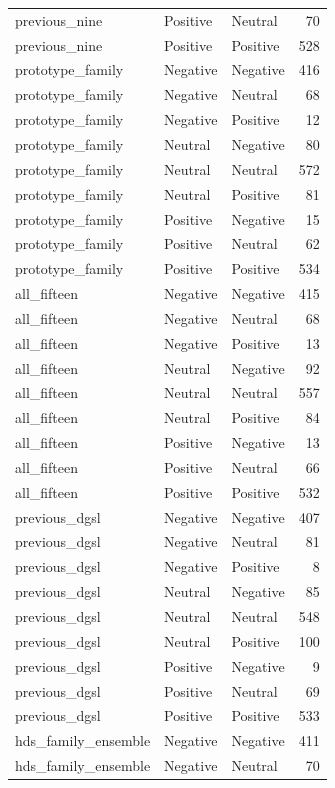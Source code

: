 \begin{tabular}{lllr}
previous\_nine & Positive & Neutral & 70 \\
previous\_nine & Positive & Positive & 528 \\
prototype\_family & Negative & Negative & 416 \\
prototype\_family & Negative & Neutral & 68 \\
prototype\_family & Negative & Positive & 12 \\
prototype\_family & Neutral & Negative & 80 \\
prototype\_family & Neutral & Neutral & 572 \\
prototype\_family & Neutral & Positive & 81 \\
prototype\_family & Positive & Negative & 15 \\
prototype\_family & Positive & Neutral & 62 \\
prototype\_family & Positive & Positive & 534 \\
all\_fifteen & Negative & Negative & 415 \\
all\_fifteen & Negative & Neutral & 68 \\
all\_fifteen & Negative & Positive & 13 \\
all\_fifteen & Neutral & Negative & 92 \\
all\_fifteen & Neutral & Neutral & 557 \\
all\_fifteen & Neutral & Positive & 84 \\
all\_fifteen & Positive & Negative & 13 \\
all\_fifteen & Positive & Neutral & 66 \\
all\_fifteen & Positive & Positive & 532 \\
previous\_dgsl & Negative & Negative & 407 \\
previous\_dgsl & Negative & Neutral & 81 \\
previous\_dgsl & Negative & Positive & 8 \\
previous\_dgsl & Neutral & Negative & 85 \\
previous\_dgsl & Neutral & Neutral & 548 \\
previous\_dgsl & Neutral & Positive & 100 \\
previous\_dgsl & Positive & Negative & 9 \\
previous\_dgsl & Positive & Neutral & 69 \\
previous\_dgsl & Positive & Positive & 533 \\
hds\_family\_ensemble & Negative & Negative & 411 \\
hds\_family\_ensemble & Negative & Neutral & 70 \\

\end{tabular}
